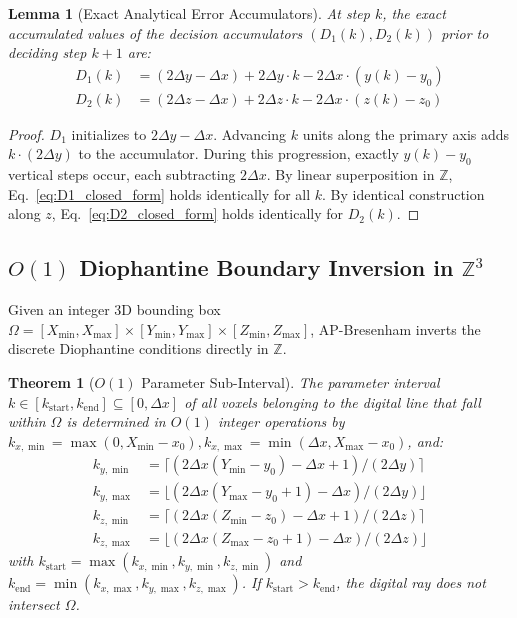 \documentclass[11pt]{article}
\newtheorem{theorem}{Theorem}
\newtheorem{lemma}{Lemma}
\begin{document}
\begin{lemma}[Exact Analytical Error Accumulators]
\label{lem:error_state}
At step $k$, the exact accumulated values of the decision accumulators $(D_1(k), D_2(k))$ prior to deciding step $k+1$ are:
\begin{align}
    D_1(k) &= (2\Delta y - \Delta x) + 2\Delta y \cdot k - 2\Delta x \cdot (y(k) - y_0) \label{eq:D1_closed_form} \\
    D_2(k) &= (2\Delta z - \Delta x) + 2\Delta z \cdot k - 2\Delta x \cdot (z(k) - z_0) \label{eq:D2_closed_form}
\end{align}
\end{lemma}

\begin{proof}
$D_1$ initializes to $2\Delta y - \Delta x$. Advancing $k$ units along the primary axis adds $k \cdot (2\Delta y)$ to the accumulator. During this progression, exactly $y(k) - y_0$ vertical steps occur, each subtracting $2\Delta x$. By linear superposition in $\mathbb{Z}$, Eq.~\eqref{eq:D1_closed_form} holds identically for all $k$. By identical construction along $z$, Eq.~\eqref{eq:D2_closed_form} holds identically for $D_2(k)$.
\end{proof}

\subsection*{$O(1)$ Diophantine Boundary Inversion in $\mathbb{Z}^3$}
Given an integer 3D bounding box $\Omega = [X_{\min}, X_{\max}] \times [Y_{\min}, Y_{\max}] \times [Z_{\min}, Z_{\max}]$, AP-Bresenham inverts the discrete Diophantine conditions directly in $\mathbb{Z}$.

\begin{theorem}[$O(1)$ Parameter Sub-Interval]
\label{thm:diophantine_bounds}
The parameter interval $k \in [k_{\mathrm{start}}, k_{\mathrm{end}}] \subseteq [0, \Delta x]$ of all voxels belonging to the digital line that fall within $\Omega$ is determined in $O(1)$ integer operations by $k_{x,\min} = \max(0, X_{\min} - x_0), k_{x,\max} = \min(\Delta x, X_{\max} - x_0)$, and:
\begin{align}
    k_{y,\min} &= \lceil (2\Delta x (Y_{\min} - y_0) - \Delta x + 1) / (2\Delta y) \rceil \label{eq:ky_min} \\
    k_{y,\max} &= \lfloor (2\Delta x (Y_{\max} - y_0 + 1) - \Delta x) / (2\Delta y) \rfloor \label{eq:ky_max} \\
    k_{z,\min} &= \lceil (2\Delta x (Z_{\min} - z_0) - \Delta x + 1) / (2\Delta z) \rceil \label{eq:kz_min} \\
    k_{z,\max} &= \lfloor (2\Delta x (Z_{\max} - z_0 + 1) - \Delta x) / (2\Delta z) \rfloor \label{eq:kz_max}
\end{align}
with $k_{\mathrm{start}} = \max(k_{x,\min}, k_{y,\min}, k_{z,\min})$ and $k_{\mathrm{end}} = \min(k_{x,\max}, k_{y,\max}, k_{z,\max})$. If $k_{\mathrm{start}} > k_{\mathrm{end}}$, the digital ray does not intersect $\Omega$.
\end{theorem}
\end{document}
